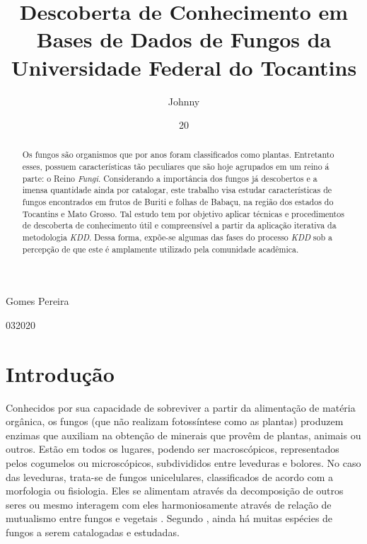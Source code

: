 \documentclass[tcc2,project]{classe_uftex/uftex}
\begin{document}
  \title{Descoberta de Conhecimento em Bases de Dados de Fungos da Universidade Federal do Tocantins}
  \author{Johnny}{Gomes Pereira}

  \date{20}{03}{2020}

  

  \maketitle
  
  \begin{abstract}
  \quad Os fungos são organismos que por anos foram classificados como plantas. Entretanto esses, possuem características tão peculiares que são hoje agrupados em um reino á parte: o Reino \emph{Fungi}. Considerando a importância dos fungos já descobertos e a imensa quantidade ainda por catalogar, este trabalho visa estudar características de fungos encontrados em frutos de Buriti e folhas de Babaçu, na região dos estados do Tocantins e Mato Grosso. Tal estudo tem por objetivo aplicar técnicas e procedimentos de descoberta de conhecimento útil e compreensível a partir da aplicação iterativa da metodologia \emph{KDD}. Dessa forma, expõe-se algumas das fases do processo \emph{KDD} sob a percepção de que este é amplamente utilizado pela comunidade acadêmica.
  \end{abstract}
  
  \section*{Introdução}
  \label{sec:introducao}

    \quad Conhecidos por sua capacidade de sobreviver a partir da alimentação de matéria orgânica, os fungos (que não realizam fotossíntese como as plantas) produzem enzimas que auxiliam na obtenção de minerais que provêm de plantas, animais ou outros. Estão em todos os lugares, podendo ser macroscópicos, representados pelos cogumelos ou microscópicos, subdivididos entre leveduras e bolores. No caso das leveduras, trata-se de fungos unicelulares, classificados de acordo com a morfologia ou fisiologia. Eles se alimentam através da decomposição de outros seres ou mesmo interagem com eles harmoniosamente através de relação de mutualismo entre fungos e vegetais \cite{2008:Peay}. Segundo , ainda há muitas espécies de fungos a serem catalogadas e estudadas.
    
\end{document}
